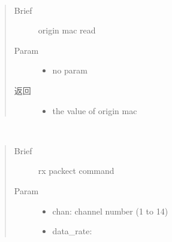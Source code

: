 \documentclass[letterpaper,10pt,english]{sphinxhowto}
\begin{document}
\begin{fulllineitems}
\begin{fulllineitems}
\begin{quote}
\begin{description}
\begin{itemize}
\end{itemize}


\end{description}\end{quote}

\end{fulllineitems}


\begin{fulllineitems}
\label{\detokenize{rfapi/index:wifi_api.WIFIAPI.esp_origin_mac}}~\begin{quote}\begin{description}
\item[{Brief}] \leavevmode
origin mac read

\item[{Param}] \leavevmode\begin{itemize}
\item {} 
no param

\end{itemize}

\item[{返回}] \leavevmode
\begin{itemize}
\item {} 
the value of origin mac

\end{itemize}


\end{description}\end{quote}

\end{fulllineitems}


\begin{fulllineitems}
\label{\detokenize{rfapi/index:wifi_api.WIFIAPI.esp_rx}}~\begin{quote}\begin{description}
\item[{Brief}] \leavevmode
rx packect command

\item[{Param}] \leavevmode\begin{itemize}
\item {} 
chan: channel number (1 to 14)

\item {} \begin{description}
\item[{data\_rate:}] \leavevmode


\end{description}
\end{itemize}
\end{description}
\end{quote}
\end{fulllineitems}
\end{fulllineitems}
\end{document}
